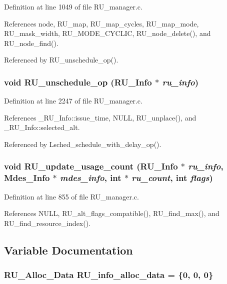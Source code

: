 Definition at line 1049 of file RU\_\-manager.c.

References node, RU\_\-map, RU\_\-map\_\-cycles, RU\_\-map\_\-mode, RU\_\-mask\_\-width, RU\_\-MODE\_\-CYCLIC, RU\_\-node\_\-delete(), and RU\_\-node\_\-find().

Referenced by RU\_\-unschedule\_\-op().
\subsubsection{\setlength{\rightskip}{0pt plus 5cm}void RU\_\-unschedule\_\-op (\bf{RU\_\-Info} $\ast$ {\em ru\_\-info})}\label{RU__manager_8c_7c5e9e0c48f57d8752d3a958ccba3022}




Definition at line 2247 of file RU\_\-manager.c.

References \_\-RU\_\-Info::issue\_\-time, NULL, RU\_\-unplace(), and \_\-RU\_\-Info::selected\_\-alt.

Referenced by Lsched\_\-schedule\_\-with\_\-delay\_\-op().
\subsubsection{\setlength{\rightskip}{0pt plus 5cm}void RU\_\-update\_\-usage\_\-count (\bf{RU\_\-Info} $\ast$ {\em ru\_\-info}, Mdes\_\-Info $\ast$ {\em mdes\_\-info}, int $\ast$ {\em ru\_\-count}, int {\em flags})}\label{RU__manager_8c_c263a00da77bf491bc9a294b31b90f22}




Definition at line 855 of file RU\_\-manager.c.

References NULL, RU\_\-alt\_\-flags\_\-compatible(), RU\_\-find\_\-max(), and RU\_\-find\_\-resource\_\-index().

\subsection{Variable Documentation}
\subsubsection{\setlength{\rightskip}{0pt plus 5cm}\bf{RU\_\-Alloc\_\-Data} \bf{RU\_\-info\_\-alloc\_\-data} = \{0, 0, 0\}\hspace{0.3cm}{\tt  [static]}}\label{RU__manager_8c_8e82045ba167ef0c11a19853d637e585}




